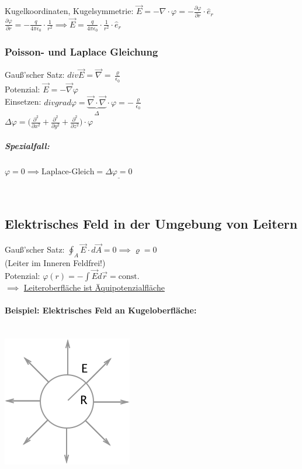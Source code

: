 \documentclass[11pt]{article}
\begin{document}
Kugelkoordinaten, Kugelsymmetrie: $ \vec{E}=-\nabla\cdot\varphi=-\frac{\partial\varphi}{\partial r}\cdot \hat{e}_r $\\

$ \frac{\partial\varphi}{\partial r}=-\frac{q}{4\pi\epsilon_0}\cdot\frac{1}{r^2} \implies \vec{E}=\frac{q}{4\pi\epsilon_0}\cdot \frac{1}{r^2}\cdot\hat{e}_r$\\

\subsubsection{Poisson- und Laplace Gleichung}

Gau\ss{}'scher Satz: $div\vec{E}=\vec{\nabla}=\frac{\varrho}{\epsilon_0}$\\
Potenzial: $\vec{E}=-\vec{\nabla}\varphi$\\

Einsetzen: $\boxed{div grad \varphi=\underbrace{\vec{\nabla}\cdot\vec{\nabla}}_{\Delta}\cdot\varphi = -\frac{\varrho}{\epsilon_0}}$\\

$ \Delta\varphi=\big(\frac{\partial^2}{\partial x^2}+\frac{\partial^2}{\partial y^2}+\frac{\partial^2}{\partial z^2}\big)\cdot\varphi $\\

\subparagraph{Spezialfall:}

$ \varphi=0
\implies \text{Laplace-Gleich}= \underline{\Delta\varphi=0} $

\hfill\\

\subsection{Elektrisches Feld in der Umgebung von Leitern}

Gau\ss{}'scher Satz: $ \oint_{A}\vec{E}\cdot d\vec{A}=0 \implies \varrho=0 $\\
(Leiter im Inneren Feldfrei!)\\

Potenzial: $\varphi(r)=-\int\vec{E}d\vec{r}= \text{const.}$\\

$\implies$ \underline{Leiteroberfläche ist Äquipotenzialfläche}\\

\paragraph{Beispiel: Elektrisches Feld an Kugeloberfläche:}
\hfill\\
\includegraphics{skizzen/14/14_8B0}\\
\end{document}
